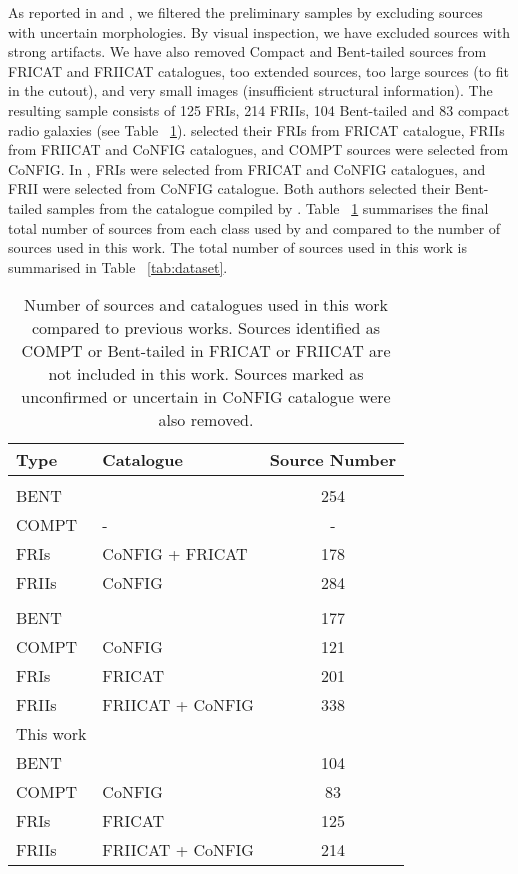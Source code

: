 \documentclass[fleqn,usenatbib]{mnras}
\begin{document}
As reported in \citet{3} and \citet{Ma2019}, we filtered the preliminary samples by excluding sources with uncertain morphologies. By visual inspection, we have excluded sources with strong artifacts. We have also removed Compact and Bent-tailed sources from FRICAT and FRIICAT catalogues, too extended sources, too large sources (to fit in the cutout),  and very small images (insufficient structural information). The resulting sample consists of 125 FRIs, 214 FRIIs, 104 Bent-tailed and 83 compact radio galaxies (see Table ~\ref{tab:sample_selection}). \citet{2} selected their FRIs from FRICAT catalogue, FRIIs from FRIICAT and CoNFIG catalogues, and COMPT sources were selected from CoNFIG. In \citet{3}, FRIs were selected from FRICAT and CoNFIG catalogues, and FRII were selected from CoNFIG catalogue. Both authors selected their Bent-tailed samples from the catalogue compiled by \citet{Proctor2011}. Table ~\ref{tab:sample_selection} summarises the final total number of sources from each class used by \citet {3} and \citet{2} compared to the number of sources used in this work.  The total number of sources used in this work is summarised in Table ~\ref{tab:dataset}.


\begin{table}
\caption{Number of sources and catalogues used in this work compared to previous works. Sources identified as COMPT or Bent-tailed in FRICAT or FRIICAT are not included in this work. Sources marked as unconfirmed or uncertain in CoNFIG catalogue were also removed.}
    \centering
    \begin{tabular}{l|l|c}
    \hline
  Type   & Catalogue  & Source Number  \\
     \hline
     \citet{3} &    & \\
         \hline
    BENT     &   \citet{Proctor2011}   &    254 \\
    COMPT     &   -  &   - \\
    FRIs     &   CoNFIG + FRICAT &   178\\
    FRIIs    &    CoNFIG & 284 \\
    
    
      \hline
      \citet{2}   &   &  \\
         \hline
    BENT     &  \citet{Proctor2011}   &   177  \\
    COMPT     &  CoNFIG   &  121 \\
    FRIs     &  FRICAT   &  201 \\
    FRIIs    &   FRIICAT + CoNFIG  & 338 \\
    
      \hline
      This work   &   &  \\
         \hline
    BENT     &  \citet{Proctor2011}    &   104  \\
    COMPT     &  CoNFIG   &  83  \\
    FRIs     &   FRICAT  &  125 \\
    FRIIs    &  FRIICAT + CoNFIG   & 214\\
    
    \hline
    \end{tabular}
    \label{tab:sample_selection}
\end{table}
\end{document}
